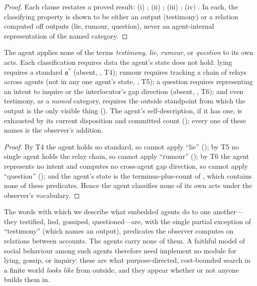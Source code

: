 \documentclass[11pt,twocolumn,a4paper]{article}
\newcommand{\acct}{\mathfrak{a}}   %
\begin{document}
\begin{proof}
Each clause restates a proved result: (i) ;
(ii) ; (iii)
; (iv)
. In each, the classifying
property is shown to be either an output (testimony) or a relation computed
off outputs (lie, rumour, question), never an agent-internal representation
of the named category.
\end{proof}

\begin{corollary}
\label{cor:agentnovocab}
The agent applies none of the terms \emph{testimony}, \emph{lie},
\emph{rumour}, or \emph{question} to its own acts. Each classification
requires data the agent's state does not hold: lying requires a standard
$\acct^\ast$ (absent, , T4); rumour requires
tracking a chain of relays across agents (not in any one agent's state,
, T5); a question requires representing an intent to inquire
or the interlocutor's gap direction (absent, ,
T6); and even testimony, as a \emph{named} category, requires the
outside standpoint from which the output is the only visible thing
(). The agent's self-description, if it has one, is
exhausted by its current disposition and committed count
(); every one of these names is the observer's addition.
\end{corollary}

\begin{proof}
By T4 the agent holds no standard, so cannot apply ``lie''
(); by T5 no single agent holds the relay chain,
so cannot apply ``rumour'' (); by T6 the agent represents no
intent and computes no cross-agent gap direction, so cannot apply
``question'' (); and the agent's state is
the terminus-plus-count of , which contains none of
these predicates. Hence the agent classifies none of its own acts under the
observer's vocabulary.
\end{proof}

\begin{principle}
\label{prin:observer}
The words with which we describe what embedded agents do to one another---
they testified, lied, gossiped, questioned---are, with the single partial
exception of ``testimony'' (which names an output), predicates the observer
computes on relations between accounts. The agents carry none of them. A
faithful model of social behaviour among such agents therefore need
implement no module for lying, gossip, or inquiry: these are what
purpose-directed, cost-bounded search in a finite world \emph{looks like}
from outside, and they appear whether or not anyone builds them in.
\end{principle}
\end{document}
